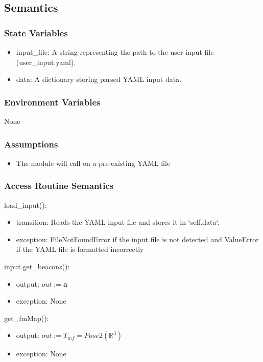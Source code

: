 \documentclass[12pt, titlepage]{article}
\begin{document}
\subsection{Semantics}

\subsubsection{State Variables}
\begin{itemize}
  \item input\_file: A string representing the path to the user input file (user\_input.yaml).
  \item data: A dictionary storing parsed YAML input data.
\end{itemize}

\subsubsection{Environment Variables}
None

\subsubsection{Assumptions}
\begin{itemize}
  \item The module will call on a pre-existing YAML file
\end{itemize}

\subsubsection{Access Routine Semantics}

\noindent load\_input():
\begin{itemize}
  \item transition: Reads the YAML input file and stores it in `self.data`.
    \item exception: FileNotFoundError if the input file is not detected and ValueError if the YAML file is formatted incorrectly
\end{itemize}

\noindent input.get\_beacons():
\begin{itemize}
    \item output: $out:=\mathbf{a}$
    \item exception: None
\end{itemize}

\noindent get\_fmMap():
\begin{itemize}
    \item output: $out:= T_{mf}=Pose2(\mathbb{R}^{3})$
    \item exception: None
\end{itemize}
\end{document}

